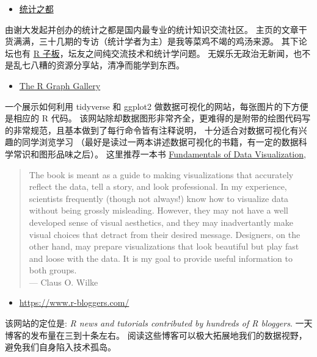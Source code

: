 \documentclass[11pt,hyperref]{ctexart}
\providecommand{\tightlist}{%
  \setlength{\itemsep}{0pt}\setlength{\parskip}{0pt}}
\begin{document}
\begin{itemize}
\tightlist
\item
  \href{https://cosx.org/}{统计之都}
\end{itemize}

由谢大发起并创办的统计之都是国内最专业的统计知识交流社区。
主页的文章干货满满，三十几期的专访（统计学者为主）是我等菜鸡不竭的鸡汤来源。
其下论坛也有 \href{https://d.cosx.org/t/r}{R
子板}，坛友之间纯交流技术和统计学问题。
无娱乐无政治无新闻，也不是乱七八糟的资源分享站，清净而能学到东西。

\begin{itemize}
\tightlist
\item
  \href{https://www.r-graph-gallery.com/index.html}{The R Graph Gallery}
\end{itemize}

一个展示如何利用 tidyverse 和 ggplot2
做数据可视化的网站，每张图片的下方便是相应的 R 代码。
该网站除却数据图形非常齐全，更难得的是附带的绘图代码写的非常规范，且基本做到了每行命令皆有注释说明，
十分适合对数据可视化有兴趣的同学浏览学习
（最好是读过一两本讲述数据可视化的书籍，有一定的数据科学常识和图形品味之后）。
这里推荐一本书 \href{https://serialmentor.com/dataviz/}{Fundamentals of
Data Visualization},

\begin{quote}
The book is meant as a guide to making visualizations that accurately
reflect the data, tell a story, and look professional. In my experience,
scientists frequently (though not always!) know how to visualize data
without being grossly misleading. However, they may not have a well
developed sense of visual aesthetics, and they may inadvertantly make
visual choices that detract from their desired message. Designers, on
the other hand, may prepare visualizations that look beautiful but play
fast and loose with the data. It is my goal to provide useful
information to both groups.\\
--- Claus O. Wilke
\end{quote}

\begin{itemize}
\tightlist
\item
  \url{https://www.r-bloggers.com/}
\end{itemize}

该网站的定位是: \emph{R news and tutorials contributed by hundreds of R
bloggers}. 一天博客的发布量在三到十条左右。
阅读这些博客可以极大拓展地我们的数据视野，避免我们自身陷入技术孤岛。
\end{document}
